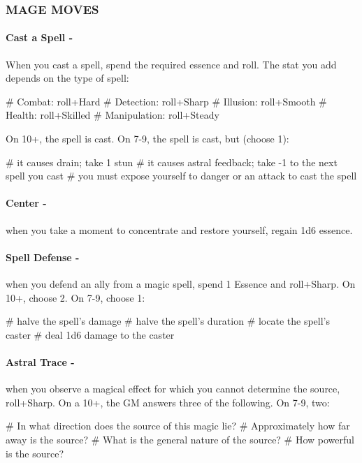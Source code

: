 \subsubsection{MAGE MOVES}
\paragraph{Cast a Spell -} When you cast a spell, spend the required essence and roll. The stat you add depends on the type of spell:
    \begin{easylist}
        # Combat: roll+Hard
        # Detection: roll+Sharp
        # Illusion: roll+Smooth
        # Health: roll+Skilled
        # Manipulation: roll+Steady
    \end{easylist}        
On 10+, the spell is cast. On 7-9, the spell is cast, but (choose 1):
    \begin{easylist}
        # it causes drain; take 1 stun
        # it causes astral feedback; take -1 to the next spell you cast
        # you must expose yourself to danger or an attack to cast the spell
    \end{easylist}

\paragraph{Center -} when you take a moment to concentrate and restore yourself, regain 1d6 essence.

\paragraph{Spell Defense -} when you defend an ally from a magic spell, spend 1 Essence and roll+Sharp. On 10+, choose 2. On 7-9, choose 1:
    \begin{easylist}
        # halve the spell’s damage
        # halve the spell’s duration
        # locate the spell’s caster
        # deal 1d6 damage to the caster
    \end{easylist}

\paragraph{Astral Trace -} when you observe a magical effect for which you cannot determine the source, roll+Sharp. On a 10+, the GM answers three of the following. On 7-9, two:
    \begin{easylist}
        # In what direction does the source of this magic lie?
        # Approximately how far away is the source?
        # What is the general nature of the source?
        # How powerful is the source?
    \end{easylist}

